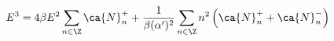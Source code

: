\begin{equation}
E^3 = 4 \beta E^2 \sum_{n \in \Z} \ca{N}^+_n
+ \frac{1}{\beta (\alpha')^2 } \sum_{n \in \Z} n^2 
\left( \ca{N}^+_n + \ca{N}^-_n \right)
\end{equation}

